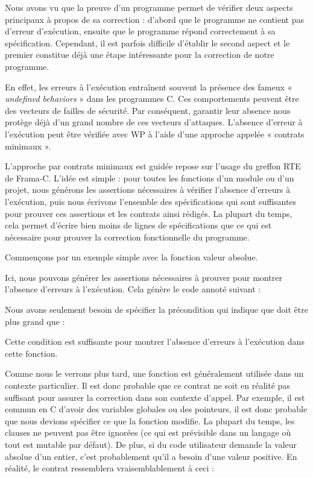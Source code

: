 Nous avons vu que la preuve d'un programme permet de vérifier deux aspects
principaux à propos de sa correction : d'abord que le programme ne contient pas
d'erreur d'exécution, ensuite que le programme répond correctement à sa
spécification. Cependant, il est parfois difficile d'établir le second aspect
et le premier constitue déjà une étape intéressante pour la correction de notre
programme.


En effet, les erreurs à l'exécution entraînent souvent la présence des fameux
« \textit{undefined behaviors} » dans les programmes C. Ces comportements peuvent être
des vecteurs de failles de sécurité. Par conséquent, garantir leur absence nous
protège déjà d'un grand nombre de ces vecteurs d'attaques. L'absence d'erreur à
l'exécution peut être vérifiée avec WP à l'aide d'une approche appelée
« contrats minimaux ».




L'approche par contrats minimaux est guidée repose sur l'usage du greffon RTE de Frama-C.
L'idée est simple : pour toutes les fonctions d'un module ou d'un projet,
nous générons les assertions nécessaires à vérifier l'absence d'erreurs à l'exécution,
puis nous écrivons l'ensemble des spécifications qui sont suffisantes
pour prouver ces assertions et les contrats ainsi rédigés. La plupart du temps, cela
permet d'écrire bien moins de lignes de spécifications que ce qui est nécessaire
pour prouver la correction fonctionnelle du programme.


Commençons par un exemple simple avec la fonction valeur absolue.




Ici, nous pouvons générer les assertions nécessaires à prouver pour montrer
l'absence d'erreurs à l'exécution. Cela génère le code annoté suivant :




Nous avons seulement besoin de spécifier la précondition qui indique que
 doit être plus grand que  :




Cette condition est suffisante pour montrer l'absence d'erreurs à l'exécution
dans cette fonction.


Comme nous le verrons plus tard, une fonction est généralement utilisée
dans un contexte particulier. Il est donc probable que ce contrat ne soit en
réalité pas suffisant pour assurer la correction dans son contexte d'appel. Par
exemple, il est commun en C d'avoir des variables globales ou des pointeurs, il
est donc probable que nous devions spécifier ce que la fonction modifie.
La plupart du temps, les clauses  ne peuvent pas être ignorées
(ce qui est prévisible dans un langage où tout est mutable par défaut). De plus,
si du code utilisateur demande la valeur absolue d'un entier, c'est probablement
qu'il a besoin d'une valeur positive. En réalité, le contrat ressemblera
vraisemblablement à ceci :


